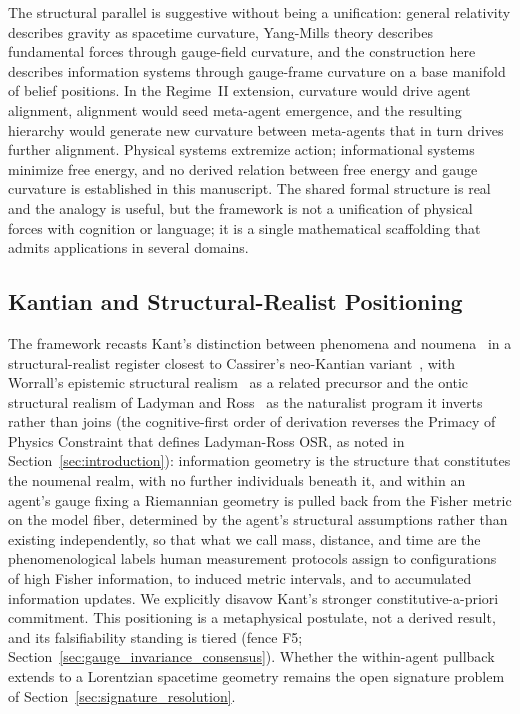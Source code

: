 \documentclass[11pt]{article}
\begin{document}
The structural parallel is suggestive without being a unification: general relativity describes gravity as spacetime curvature, Yang-Mills theory describes fundamental forces through gauge-field curvature, and the construction here describes information systems through gauge-frame curvature on a base manifold of belief positions. In the Regime~II extension, curvature would drive agent alignment, alignment would seed meta-agent emergence, and the resulting hierarchy would generate new curvature between meta-agents that in turn drives further alignment. Physical systems extremize action; informational systems minimize free energy, and no derived relation between free energy and gauge curvature is established in this manuscript. The shared formal structure is real and the analogy is useful, but the framework is not a unification of physical forces with cognition or language; it is a single mathematical scaffolding that admits applications in several domains.

\subsection{Kantian and Structural-Realist Positioning}

The framework recasts Kant's distinction between phenomena and noumena~\cite{Kant1781} in a structural-realist register closest to Cassirer's neo-Kantian variant~\cite{Cassirer1923}, with Worrall's epistemic structural realism~\cite{Worrall1989} as a related precursor and the ontic structural realism of Ladyman and Ross~\cite{Ladyman2007} as the naturalist program it inverts rather than joins (the cognitive-first order of derivation reverses the Primacy of Physics Constraint that defines Ladyman-Ross OSR, as noted in Section~\ref{sec:introduction}): information geometry is the structure that constitutes the noumenal realm, with no further individuals beneath it, and within an agent's gauge fixing a Riemannian geometry is pulled back from the Fisher metric on the model fiber, determined by the agent's structural assumptions rather than existing independently, so that what we call mass, distance, and time are the phenomenological labels human measurement protocols assign to configurations of high Fisher information, to induced metric intervals, and to accumulated information updates. We explicitly disavow Kant's stronger constitutive-a-priori commitment. This positioning is a metaphysical postulate, not a derived result, and its falsifiability standing is tiered (fence F5; Section~\ref{sec:gauge_invariance_consensus}). Whether the within-agent pullback extends to a Lorentzian spacetime geometry remains the open signature problem of Section~\ref{sec:signature_resolution}.
\end{document}
